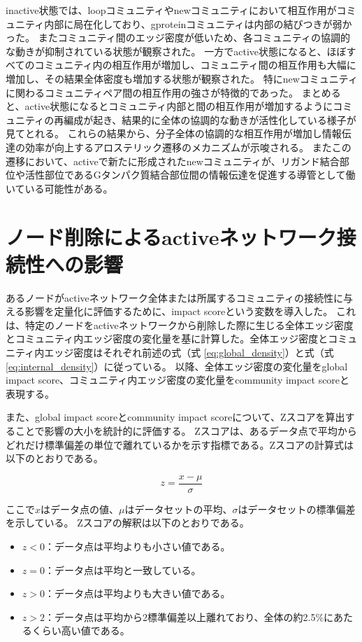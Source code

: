inactive状態では、loopコミュニティやnewコミュニティにおいて相互作用がコミュニティ内部に局在化しており、gproteinコミュニティは内部の結びつきが弱かった。
またコミュニティ間のエッジ密度が低いため、各コミュニティの協調的な動きが抑制されている状態が観察された。
一方でactive状態になると、ほぼすべてのコミュニティ内の相互作用が増加し、コミュニティ間の相互作用も大幅に増加し、その結果全体密度も増加する状態が観察された。
特にnewコミュニティに関わるコミュニティペア間の相互作用の強さが特徴的であった。
まとめると、active状態になるとコミュニティ内部と間の相互作用が増加するようにコミュニティの再編成が起き、結果的に全体の協調的な動きが活性化している様子が見てとれる。
これらの結果から、分子全体の協調的な相互作用が増加し情報伝達の効率が向上するアロステリック遷移のメカニズムが示唆される。
またこの遷移において、activeで新たに形成されたnewコミュニティが、リガンド結合部位や活性部位であるGタンパク質結合部位間の情報伝達を促進する導管として働いている可能性がある。

\section{ノード削除によるactiveネットワーク接続性への影響}

あるノードがactiveネットワーク全体または所属するコミュニティの接続性に与える影響を定量化に評価するために、impact scoreという変数を導入した。
これは、特定のノードをactiveネットワークから削除した際に生じる全体エッジ密度とコミュニティ内エッジ密度の変化量を基に計算した。全体エッジ密度とコミュニティ内エッジ密度はそれぞれ前述の式（式 \ref{eq:global_density}）と式（式 \ref{eq:internal_density}）に従っている。
以降、全体エッジ密度の変化量をglobal impact score、コミュニティ内エッジ密度の変化量をcommunity impact scoreと表現する。

また、global impact scoreとcommunity impact scoreについて、Zスコアを算出することで影響の大小を統計的に評価する。
Zスコアは、あるデータ点で平均からどれだけ標準偏差の単位で離れているかを示す指標である。Zスコアの計算式は以下のとおりである。

\[
z = \frac{x - \mu}{\sigma}
\]

ここで$x$はデータ点の値、$\mu$はデータセットの平均、$\sigma$はデータセットの標準偏差を示している。
Zスコアの解釈は以下のとおりである。
\begin{itemize}
    \item \( z < 0 \)：データ点は平均よりも小さい値である。
    \item \( z = 0 \)：データ点は平均と一致している。
    \item \( z > 0 \)：データ点は平均よりも大きい値である。
    \item \( z > 2 \)：データ点は平均から2標準偏差以上離れており、全体の約2.5\%にあたるくらい高い値である。
\end{itemize}

